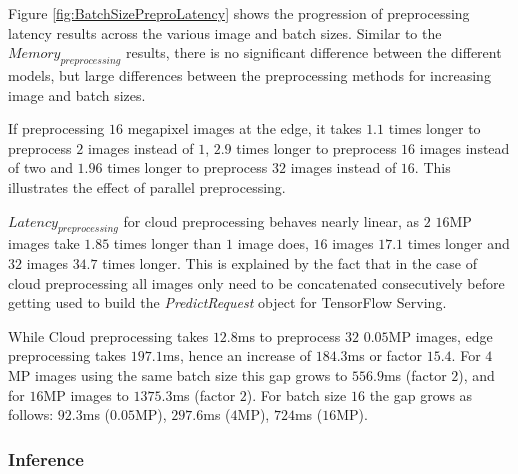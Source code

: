 Figure \ref{fig:BatchSizePreproLatency} shows the progression of preprocessing latency results across the various image and batch sizes.
Similar to the $Memory_{preprocessing}$ results, there is no significant difference between the different models, but large differences between the preprocessing methods for increasing image and batch sizes.

If preprocessing $16$ megapixel images at the edge, it takes $1.1$ times longer to preprocess $2$ images instead of $1$, $2.9$ times longer to preprocess $16$ images instead of two and $1.96$ times longer to preprocess $32$ images instead of $16$.
This illustrates the effect of parallel preprocessing.

$Latency_{preprocessing}$ for cloud preprocessing behaves nearly linear, as $2$ $16$MP images take $1.85$ times longer than $1$ image does, $16$ images $17.1$ times longer and $32$ images $34.7$ times longer.
This is explained by the fact that in the case of cloud preprocessing all images only need to be concatenated consecutively before getting used to build the \emph{PredictRequest} object for TensorFlow Serving. 


While Cloud preprocessing takes $12.8$ms to preprocess $32$ $0.05$MP images, edge preprocessing takes $197.1$ms, hence an increase of $184.3$ms or factor $15.4$. For $4$MP images using the same batch size this gap grows to $556.9$ms (factor $2$), and for $16$MP images to $1375.3$ms (factor $2$).
For batch size $16$ the gap grows as follows: $92.3$ms ($0.05$MP), $297.6$ms ($4$MP), $724$ms ($16$MP).






\FloatBarrier
\subsubsection{Inference}

